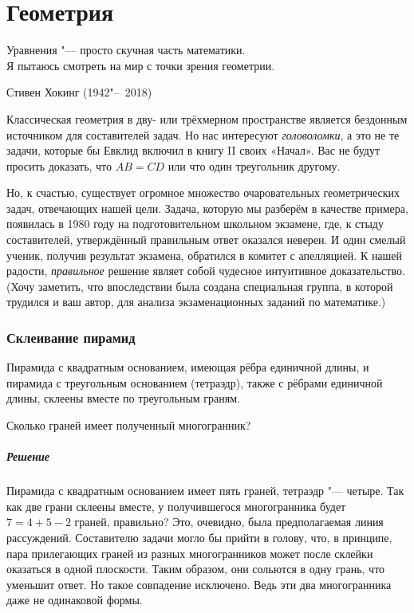 \documentclass[twoside]{book}
\makeatletter
\newcommand{\rindex}[2][\imki@jobname]{%
  \index[#1]{\detokenize{#2}}%
}
\makeatother
\begin{document}
\chapter{Геометрия}

\setlength{\epigraphwidth}{.66\textwidth}
\epigraph{Уравнения "--- просто скучная часть математики.\\
Я пытаюсь смотреть на мир с точки зрения геометрии.\vspace{1ex}}{Стивен Хокинг (1942"--~2018)}

Классическая геометрия в дву- или трёхмерном пространстве является бездонным источником для составителей задач. 
Но нас интересуют \emph{головоломки}, а это не те задачи, которые бы Евклид включил в книгу II своих «Начал».
Вас не будут просить доказать, что $AB=CD$ или что один треугольник  другому.

Но, к счастью, существует огромное множество очаровательных геометрических задач, отвечающих нашей цели. 
Задача, которую мы разберём в качестве примера, появилась в 1980 году на подготовительном  школьном экзамене, %
где, к стыду составителей, %
утверждённый правильным ответ оказался неверен.
И один смелый ученик, получив результат экзамена, обратился в комитет с апелляцией.
К нашей радости, \emph{правильное} решение являет собой  чудесное интуитивное доказательство.
(Хочу заметить, что впоследствии была создана специальная группа, в которой  трудился и ваш автор, для анализа экзаменационных заданий по математике.)

\subsection*{Склеивание пирамид}%
\rindex{Склеивание пирамид}

Пирамида с квадратным основанием, имеющая рёбра единичной длины, и пирамида с треугольным основанием (тетраэдр), также с рёбрами единичной длины, склеены вместе по треугольным граням.

Сколько граней имеет полученный многогранник?

\paragraph{Решение}

Пирамида с квадратным основанием имеет пять граней, тетраэдр "--- четыре.
Так как две грани склеены вместе, у получившегося многогранника будет $7=4+5-2$ граней, правильно?
Это, очевидно, была предполагаемая линия рассуждений.
Составителю задачи могло бы прийти в голову, что, в принципе, пара прилегающих граней из разных многогранников может после склейки оказаться в одной плоскости.
Таким образом, они сольются в одну грань, что уменьшит ответ.
Но  такое совпадение исключено.
Ведь эти два многогранника даже не одинаковой формы.
\end{document}
